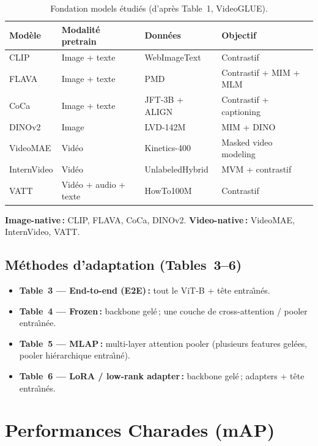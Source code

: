 \documentclass[11pt,a4paper]{article}
\begin{document}
\begin{table}[h]
\centering
\caption{Fondation models \'etudi\'es (d'apr\`es Table~1, VideoGLUE).}
\label{tab:fm-char}
\small
\begin{tabular}{@{}llll@{}}
\toprule
Mod\`ele & Modalit\'e pretrain & Donn\'ees & Objectif \\
\midrule
CLIP & Image + texte & WebImageText & Contrastif \\
FLAVA & Image + texte & PMD & Contrastif + MIM + MLM \\
CoCa & Image + texte & JFT-3B + ALIGN & Contrastif + captioning \\
DINOv2 & Image & LVD-142M & MIM + DINO \\
VideoMAE & Vid\'eo & Kinetics-400 & Masked video modeling \\
InternVideo & Vid\'eo & UnlabeledHybrid & MVM + contrastif \\
VATT & Vid\'eo + audio + texte & HowTo100M & Contrastif \\
\bottomrule
\end{tabular}
\end{table}

\noindent
\textbf{Image-native\,:} CLIP, FLAVA, CoCa, DINOv2.
\textbf{Video-native\,:} VideoMAE, InternVideo, VATT.

\subsection*{M\'ethodes d'adaptation (Tables~3--6)}

\begin{itemize}[nosep]
  \item \textbf{Table~3 --- End-to-end (E2E)\,:} tout le ViT-B + t\^{e}te entra\^{\i}n\'es.
  \item \textbf{Table~4 --- Frozen\,:} backbone gel\'e\,; une couche de
        cross-attention / pooler entra\^{\i}n\'ee.
  \item \textbf{Table~5 --- MLAP\,:} multi-layer attention pooler
        (plusieurs features gel\'ees, pooler hi\'erarchique entra\^{\i}n\'e).
  \item \textbf{Table~6 --- LoRA / low-rank adapter\,:} backbone gel\'e\,;
        adapters + t\^{e}te entra\^{\i}n\'es.
\end{itemize}

\section{Performances Charades (mAP)}
\end{document}

